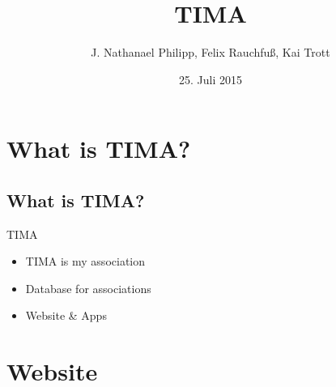 \documentclass[11pt]{beamer}
\author{J. Nathanael Philipp, Felix Rauchfuß, Kai Trott}
\title{TIMA}
\date{25. Juli 2015}
\institute{Universität Leipzig}
\begin{document}
\section{}
\begin{frame}
\titlepage
\end{frame}

\section{What is TIMA?}
\subsection{What is TIMA?}
\begin{frame}{TIMA}
	\begin{itemize}
		\item TIMA is my association
		\item Database for associations
		\item Website \& Apps
	\end{itemize}
\end{frame}

\section{Website}
\end{document}
